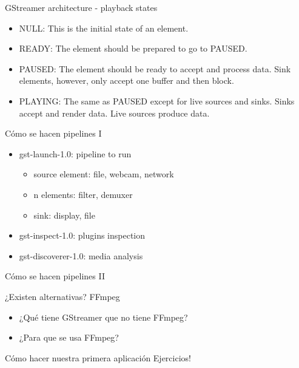 \documentclass{beamer}
\begin{document}
\begin{frame}{GStreamer architecture - playback states}
  \begin{itemize}
    \item NULL: This is the initial state of an element.
    \item READY: The element should be prepared to go to PAUSED.
    \item PAUSED: The element should be ready to accept and process data. Sink elements, however, only accept one buffer and then block.
    \item PLAYING: The same as PAUSED except for live sources and sinks. Sinks accept and render data. Live sources produce data.
  \end{itemize}
\end{frame}

\begin{frame}{Cómo se hacen pipelines I}
\begin{itemize}
  \item gst-launch-1.0: pipeline to run
  \begin{itemize}
    \item source element: file, webcam, network
    \item n elements: filter, demuxer
    \item sink: display, file
  \end{itemize}
  \item gst-inspect-1.0: plugins inspection
  \item gst-discoverer-1.0: media analysis
\end{itemize}
\end{frame}

\begin{frame}{Cómo se hacen pipelines II}
  
\end{frame}

\begin{frame}{¿Existen alternativas?}
FFmpeg
\begin{itemize}
  \item ¿Qué tiene GStreamer que no tiene FFmpeg?
  \item ¿Para que se usa FFmpeg?
\end{itemize}
\end{frame}

\begin{frame}{Cómo hacer nuestra primera aplicación}
Ejercicios!
\end{frame}
\end{document}
